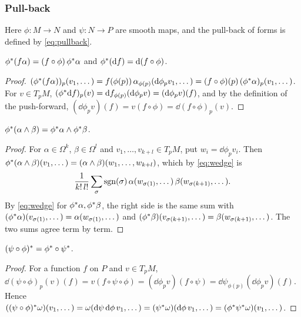 \subsubsection*{Pull-back}

Here $\phi:M\to N$ and $\psi:N\to P$ are smooth maps, and the pull-back of forms is defined by \eqref{eq:pullback}.

\begin{identity}\label{id:pbfun}
$\phi{}^{*}(f\alpha)=(f\circ\phi)\,\phi{}^{*}\alpha$ and $\phi{}^{*}(\mathrm{d} f)=\mathrm{d}(f\circ\phi)$.
\end{identity}
\begin{proof}
 $(\phi{}^{*}(f\alpha))_p(v_1,\dots)=f(\phi(p))\,\alpha_{\phi(p)}(\mathrm{d}\phi_pv_1,\dots)=(f\circ\phi)(p)\,(\phi{}^{*}\alpha)_p(v_1,\dots)$.
 For $v\in T_pM$, $(\phi{}^{*}\mathrm{d} f)_p(v)=\mathrm{d} f_{\phi(p)}(\mathrm{d}\phi_pv)=(\mathrm{d}\phi_pv)(f)$, and by the definition of the
push-forward, $(\dd\phi_pv)(f)=v(f\circ\phi)=\dd(f\circ\phi)_p(v)$.
\end{proof}

\begin{identity}\label{id:pbwedge}
$\phi{}^{*}(\alpha\wedge\beta)=\phi{}^{*}\alpha\wedge\phi{}^{*}\beta$.
\end{identity}
\begin{proof}
 For $\alpha\in\Omega^k$, $\beta\in\Omega^l$ and $v_1,\dots,v_{k+l}\in T_pM$, put $w_i=\dd\phi_pv_i$. Then
$\phi{}^{*}(\alpha\wedge\beta)(v_1,\dots)=(\alpha\wedge\beta)(w_1,\dots,w_{k+l})$, which by \eqref{eq:wedge} is
\[
\frac1{k!\,l!}\sum_\sigma\mathrm{sgn}(\sigma)\,\alpha(w_{\sigma(1)},\dots)\,\beta(w_{\sigma(k+1)},\dots).
\]
 By \eqref{eq:wedge} for $\phi{}^{*}\alpha,\phi{}^{*}\beta$, the right side is the same sum with
$(\phi{}^{*}\alpha)(v_{\sigma(1)},\dots)=\alpha(w_{\sigma(1)},\dots)$ and $(\phi{}^{*}\beta)(v_{\sigma(k+1)},\dots)=\beta(w_{\sigma(k+1)},\dots)$.
The two sums agree term by term.
\end{proof}

\begin{identity}\label{id:pbcomp}
$(\psi\circ\phi){}^{*}=\phi{}^{*}\circ\psi{}^{*}$.
\end{identity}
\begin{proof}
 For a function $f$ on $P$ and $v\in T_pM$,
$\dd(\psi\circ\phi)_p(v)(f)=v(f\circ\psi\circ\phi)=(\dd\phi_pv)(f\circ\psi)=\dd\psi_{\phi(p)}(\dd\phi_pv)(f)$.
 Hence $((\psi\circ\phi){}^{*}\omega)(v_1,\dots)=\omega(\mathrm{d}\psi\,\mathrm{d}\phi\,v_1,\dots)=(\psi{}^{*}\omega)(\mathrm{d}\phi\,v_1,\dots)=(\phi{}^{*}\psi{}^{*}\omega)(v_1,\dots)$.
\end{proof}

